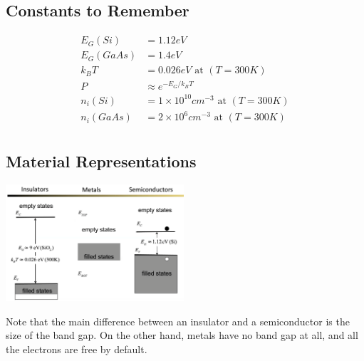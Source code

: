 \documentclass[nobib]{tufte-handout}
\begin{document}
\subsection*{Constants to Remember}
\begin{align*}
    E_G(Si) &= 1.12eV \\
    E_G(GaAs) &= 1.4eV \\
    k_B T &= 0.026eV \text{ at }(T = 300K)\\
    P &\approx e^{-E_G / k_B T}\\
    n_i(Si) &= 1\times 10^{10} cm^{-3} \text{ at }(T = 300K)\\
    n_i(GaAs) &= 2\times 10^{6} cm^{-3} \text{ at }(T = 300K)\\
\end{align*}
\subsection*{Material Representations}
\begin{center}
    \includegraphics*[width = 250px]{images/material_representations.png}
\end{center}
Note that the main difference between an insulator and a semiconductor is the size of the band gap. On the other hand, metals have no band gap at all, and all the electrons are free by default.\\
\end{document}
